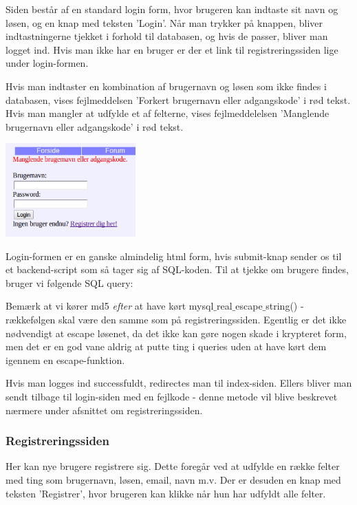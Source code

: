 \documentclass{article}
\begin{document}
Siden består af en standard login form, hvor brugeren kan indtaste sit navn og løsen, og en knap med teksten 'Login'. Når man trykker på knappen, bliver indtastningerne tjekket i forhold til databasen, og hvis de passer, bliver man logget ind. Hvis man ikke har en bruger er der et link til registreringssiden lige under login-formen.

Hvis man indtaster en kombination af brugernavn og løsen som ikke findes i databasen, vises fejlmeddelsen 'Forkert brugernavn eller adgangskode' i rød tekst. Hvis man mangler at udfylde et af felterne, vises fejlmeddelelsen 'Manglende brugernavn eller adgangskode' i rød tekst. 

\begin{center}
\includegraphics[width=50mm]{mi09.png}
\end{center}

Login-formen er en ganske almindelig html form, hvis submit-knap sender os til et backend-script som så tager sig af SQL-koden. Til at tjekke om brugere findes, bruger vi følgende SQL query:



Bemærk at vi kører md5 \emph{efter} at have kørt mysql$\_$real$\_$escape$\_$string() - rækkefølgen skal være den samme som på registreringssiden. Egentlig er det ikke nødvendigt at escape løsenet, da det ikke kan gøre nogen skade i krypteret form, men det er en god vane aldrig at putte ting i queries uden at have kørt dem igennem en escape-funktion.

Hvis man logges ind successfuldt, redirectes man til index-siden. Ellers bliver man sendt tilbage til login-siden med en fejlkode - denne metode vil blive beskrevet nærmere under afsnittet om registreringssiden.

\subsubsection{Registreringssiden}
Her kan nye brugere registrere sig. Dette foregår ved at udfylde en række felter med ting som brugernavn, løsen, email, navn m.v. Der er desuden en knap med teksten 'Registrer', hvor brugeren kan klikke når hun har udfyldt alle felter.
\end{document}
